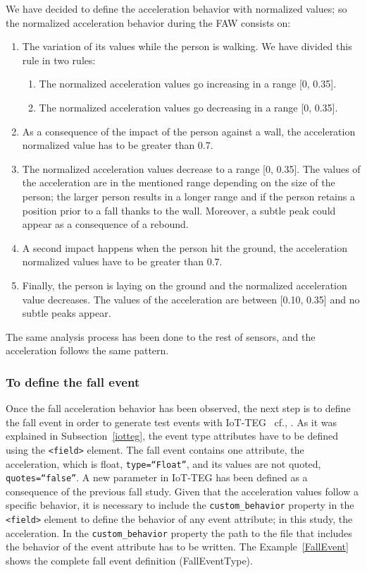 \documentclass[10pt,journal,compsoc]{IEEEtran}
\begin{document}
We have decided to define the acceleration behavior with normalized values; so the normalized acceleration behavior during the FAW consists on:
\begin{enumerate}
	\item The variation of its values while the person is walking. We have divided this rule in two rules:
	\begin{enumerate}
		\item The normalized acceleration values go increasing in a range [0, 0.35].
		\item The normalized acceleration values go decreasing in a range [0, 0.35].
	\end{enumerate}
	\item As a consequence of the impact of the person against a wall, the acceleration normalized value has to be greater than 0.7.
	\item The normalized acceleration values decrease to a range [0, 0.35]. The values of the acceleration are in the mentioned range depending on the size of the person; the larger person results in a longer range and if the person retains a position prior to a fall thanks to the wall. Moreover, a subtle peak could appear as a consequence of a rebound.
	\item A second impact happens when the person hit the ground, the acceleration normalized values have to be greater than 0.7.
	\item Finally, the person is laying on the ground and the normalized acceleration value decreases. The values of the acceleration are between [0.10, 0.35] and no subtle peaks appear. 
\end{enumerate}
The same analysis process has been done to the rest of sensors, and the acceleration follows the same pattern.

\subsubsection{To define the fall event} Once the fall acceleration behavior has been observed, the next step is to define the 
fall event in order to generate test events with IoT-TEG~ cf.\cite{LorenaFall}, \cite{TesisGutierrez2017,Gutierrez2017}. As it was explained in 
Subsection~\ref{iotteg}, the event type attributes have
to be defined using the \texttt{<field>} element. The fall event contains one attribute, the acceleration, which is float, 
\texttt{type=``Float''}, and its values are not quoted, \texttt{quotes=``false''}. A new parameter in IoT-TEG has been defined as a 
consequence of the previous fall study. Given that the acceleration values follow a specific behavior, it is necessary to include 
the \texttt{custom\_behavior} property in the \texttt{<field>} element to define the behavior of any event attribute; 
in this study, the acceleration. In the \texttt{custom\_behavior} property the path to the file that includes the behavior of the 
event attribute has to be written. The Example~\ref{FallEvent} shows the complete fall event definition (FallEventType).
\end{document}
